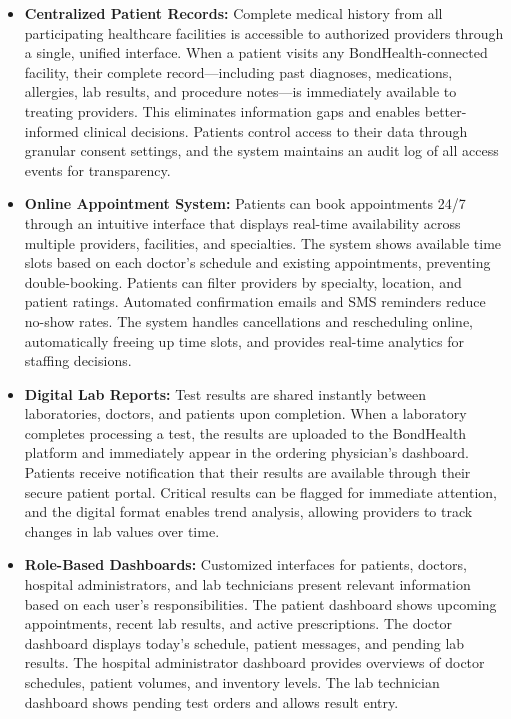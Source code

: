 \begin{itemize}
    \item \textbf{Centralized Patient Records:} Complete medical history from all participating healthcare facilities is accessible to authorized providers through a single, unified interface. When a patient visits any BondHealth-connected facility, their complete record—including past diagnoses, medications, allergies, lab results, and procedure notes—is immediately available to treating providers. This eliminates information gaps and enables better-informed clinical decisions. Patients control access to their data through granular consent settings, and the system maintains an audit log of all access events for transparency.

    \item \textbf{Online Appointment System:} Patients can book appointments 24/7 through an intuitive interface that displays real-time availability across multiple providers, facilities, and specialties. The system shows available time slots based on each doctor's schedule and existing appointments, preventing double-booking. Patients can filter providers by specialty, location, and patient ratings. Automated confirmation emails and SMS reminders reduce no-show rates. The system handles cancellations and rescheduling online, automatically freeing up time slots, and provides real-time analytics for staffing decisions.

    \item \textbf{Digital Lab Reports:} Test results are shared instantly between laboratories, doctors, and patients upon completion. When a laboratory completes processing a test, the results are uploaded to the BondHealth platform and immediately appear in the ordering physician's dashboard. Patients receive notification that their results are available through their secure patient portal. Critical results can be flagged for immediate attention, and the digital format enables trend analysis, allowing providers to track changes in lab values over time.

    \item \textbf{Role-Based Dashboards:} Customized interfaces for patients, doctors, hospital administrators, and lab technicians present relevant information based on each user's responsibilities. The patient dashboard shows upcoming appointments, recent lab results, and active prescriptions. The doctor dashboard displays today's schedule, patient messages, and pending lab results. The hospital administrator dashboard provides overviews of doctor schedules, patient volumes, and inventory levels. The lab technician dashboard shows pending test orders and allows result entry.


\end{itemize}

